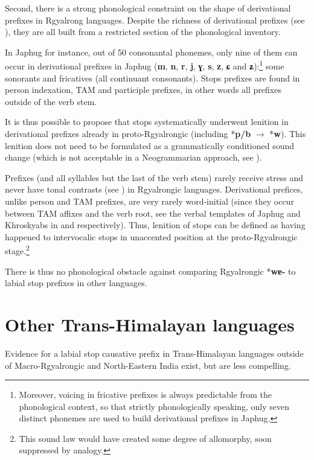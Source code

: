 \documentclass[oneside,a4paper,11pt]{article}
\newcommand{\ipa}[1]{\textbf{{\phon\mbox{#1}}}} %
\begin{document}
Second, there is a strong phonological constraint on the shape of derivational prefixes in Rgyalrong languages. Despite the richness of derivational prefixes (see \citealt{jackson14morpho, jacques14antipassive}), they are all built from a restricted section of the phonological inventory.

In Japhug for instance, out of 50 consonantal phonemes, only nine of them can occur in derivational prefixes in Japhug (\ipa{m}, \ipa{n}, \ipa{r}, \ipa{j}, \ipa{ɣ}, \ipa{s}, \ipa{z}, \ipa{ɕ} and \ipa{ʑ}):\footnote{Moreover, voicing in fricative prefixes is always predictable from the phonological context, so that strictly phonologically speaking, only seven distinct phonemes are used to build derivational prefixes in Japhug.} some sonorants and fricatives (all continuant consonants). Stops prefixes are found in person indexation, TAM and participle prefixes, in other words all prefixes outside of the verb stem. 

It is thus possible to propose that stops systematically underwent lenition in derivational prefixes already in proto-Rgyalrongic (including *\ipa{p/b} $\rightarrow$ *\ipa{w}). This lenition does not need to be formulated as a grammatically conditioned sound change (which is not acceptable in a Neogrammarian approach, see \citealt{hill14conditioned}). 

Prefixes (and all syllables but the last of the verb stem) rarely receive stress and never have tonal contrasts (see \citealt{jackson05yingao}) in Rgyalrongic languages. Derivational prefices, unlike person and TAM prefixes, are very rarely word-initial (since they occur between TAM affixes and the verb root, see the verbal templates of Japhug and Khroskyabs in \citealt{jacques13harmonization} and \citealt{lai15person} respectively). Thus, lenition of stops can be defined as having happened to intervocalic stops in unaccented position at the proto-Rgyalrongic stage.\footnote{This sound law would have created some degree of allomorphy, soon suppressed by analogy.}

There is thus no phonological obstacle against comparing Rgyalrongic *\ipa{wɐ-} to labial stop prefixes in other languages.

 \section{Other Trans-Himalayan languages} 
Evidence for a labial stop causative  prefix in Trans-Himalayan languages outside of Macro-Rgyalrongic and North-Eastern India exist, but are less compelling.
\end{document}
